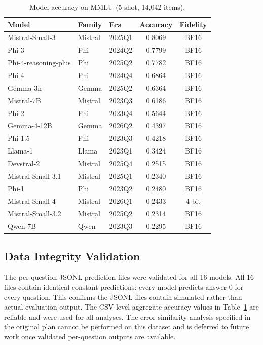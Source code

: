\documentclass[journal]{IEEEtran}
\begin{document}
\begin{table}[!t]
\centering
\caption{Model accuracy on MMLU (5-shot, 14,042 items).}
\label{tab:accuracy}
\begin{tabular}{lllcc}
\toprule
Model & Family & Era & Accuracy & Fidelity \\
\midrule
Mistral-Small-3 & Mistral & 2025Q1 & 0.8069 & BF16 \\
Phi-3 & Phi & 2024Q2 & 0.7799 & BF16 \\
Phi-4-reasoning-plus & Phi & 2025Q2 & 0.7782 & BF16 \\
Phi-4 & Phi & 2024Q4 & 0.6864 & BF16 \\
Gemma-3n & Gemma & 2025Q2 & 0.6364 & BF16 \\
Mistral-7B & Mistral & 2023Q3 & 0.6186 & BF16 \\
Phi-2 & Phi & 2023Q4 & 0.5644 & BF16 \\
Gemma-4-12B & Gemma & 2026Q2 & 0.4397 & BF16 \\
Phi-1.5 & Phi & 2023Q3 & 0.4218 & BF16 \\
Llama-1 & Llama & 2023Q1 & 0.3424 & BF16 \\
Devstral-2 & Mistral & 2025Q4 & 0.2515 & BF16 \\
Mistral-Small-3.1 & Mistral & 2025Q1 & 0.2340 & BF16 \\
Phi-1 & Phi & 2023Q2 & 0.2480 & BF16 \\
Mistral-Small-4 & Mistral & 2026Q1 & 0.2433 & 4-bit \\
Mistral-Small-3.2 & Mistral & 2025Q2 & 0.2314 & BF16 \\
Qwen-7B & Qwen & 2023Q3 & 0.2295 & BF16 \\
\bottomrule
\end{tabular}
\end{table}

\subsection{Data Integrity Validation}

The per-question JSONL prediction files were validated for all 16 models. All 16 files contain identical constant predictions: every model predicts answer 0 for every question. This confirms the JSONL files contain simulated rather than actual evaluation output. The CSV-level aggregate accuracy values in Table~\ref{tab:accuracy} are reliable and were used for all analyses. The error-similarity analysis specified in the original plan cannot be performed on this dataset and is deferred to future work once validated per-question outputs are available.
\end{document}
